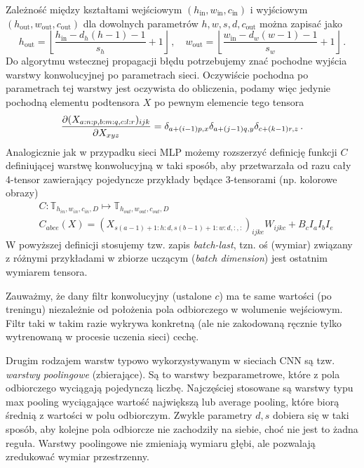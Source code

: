 \documentclass{myclass}
\begin{document}
Zależność między kształtami wejściowym \((h_\text{in},w_\text{in},c_\text{in})\) i wyjściowym
\((h_\text{out},w_\text{out},c_\text{out})\) dla dowolnych parametrów \(h,w,s,d,c_\text{out}\) można
zapisać jako 
\begin{equation*}
    h_\text{out} = \left\lfloor \frac{h_\text{in} - d_h(h-1) - 1}{s_h} + 1\right\rfloor\,,\quad w_\text{out} = \left\lfloor \frac{w_\text{in} - d_w(w-1) - 1}{s_w} + 1\right\rfloor\,.
\end{equation*}
Do algorytmu wstecznej propagacji błędu potrzebujemy znać pochodne wyjścia warstwy konwolucyjnej po
parametrach sieci. Oczywiście pochodna po parametrach tej warstwy jest oczywista do obliczenia,
podamy więc jedynie pochodną elementu podtensora \(X\) po pewnym elemencie tego tensora
\begin{equation*}
    \pdv{(X_{a:n:p,b:m:q,c:l:r})_{ijk}}{X_{xyz}} = \delta_{a+(i-1)p,x}\delta_{a+(j-1)q,y}\delta_{c+(k-1)r,z}\,.
\end{equation*}
Analogicznie jak w przypadku sieci MLP możemy rozszerzyć definicję funkcji \(C\) definiującej
warstwę konwolucyjną w taki sposób, aby przetwarzała od razu cały 4-tensor zawierający pojedyncze
przykłady będące 3-tensorami (np. kolorowe obrazy)
\begin{equation*}
    \begin{split}
        &C: \mathbb{T}_{h_{in}, w_{in}, c_{in}, D} \mapsto \mathbb{T}_{h_{out}, w_{out}, c_{out}, D}\\
        &C_{abce}(X) = (X_{s(a-1)+1:h:d,s(b-1)+1:w:d,:,:})_{ijke}W_{ijkc} + B_c I_a I_b I_e
    \end{split}
\end{equation*}
W powyższej definicji stosujemy tzw. zapis \textit{batch-last}, tzn. oś (wymiar) związany z różnymi
przykładami w zbiorze uczącym (\textit{batch dimension}) jest ostatnim wymiarem tensora.

Zauważmy, że dany filtr konwolucyjny (ustalone \(c\)) ma te same wartości (po treningu) niezależnie
od położenia pola odbiorczego w wolumenie wejściowym. Filtr taki w takim razie wykrywa konkretną
(ale nie zakodowaną ręcznie tylko wytrenowaną w procesie uczenia sieci) cechę.

Drugim rodzajem warstw typowo wykorzystywanym w sieciach CNN są tzw. \textit{warstwy poolingowe}
(zbierające). Są to warstwy bezparametrowe, które z pola odbiorczego wyciągają pojedynczą liczbę.
Najczęściej stosowane są warstwy typu max pooling wyciągające wartość największą lub average
pooling, które biorą średnią z wartości w polu odbiorczym. Zwykle parametry \(d, s\) dobiera się w
taki sposób, aby kolejne pola odbiorcze nie zachodziły na siebie, choć nie jest to żadna reguła.
Warstwy poolingowe nie zmieniają wymiaru głębi, ale pozwalają zredukować wymiar przestrzenny.
\end{document}
